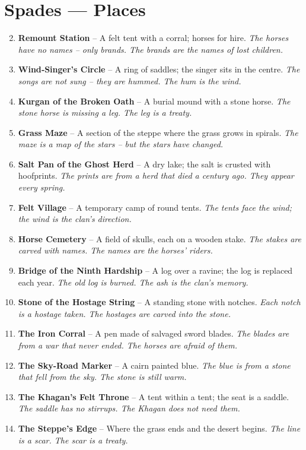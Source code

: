 \documentclass[11pt]{book}
\begin{document}
\section*{Spades — Places}
\begin{enumerate}
\setcounter{enumi}{1}
\item \textbf{Remount Station} – A felt tent with a corral; horses for hire. \textit{The horses have no names – only brands. The brands are the names of lost children.}
\item \textbf{Wind‑Singer’s Circle} – A ring of saddles; the singer sits in the centre. \textit{The songs are not sung – they are hummed. The hum is the wind.}
\item \textbf{Kurgan of the Broken Oath} – A burial mound with a stone horse. \textit{The stone horse is missing a leg. The leg is a treaty.}
\item \textbf{Grass Maze} – A section of the steppe where the grass grows in spirals. \textit{The maze is a map of the stars – but the stars have changed.}
\item \textbf{Salt Pan of the Ghost Herd} – A dry lake; the salt is crusted with hoofprints. \textit{The prints are from a herd that died a century ago. They appear every spring.}
\item \textbf{Felt Village} – A temporary camp of round tents. \textit{The tents face the wind; the wind is the clan’s direction.}
\item \textbf{Horse Cemetery} – A field of skulls, each on a wooden stake. \textit{The stakes are carved with names. The names are the horses’ riders.}
\item \textbf{Bridge of the Ninth Hardship} – A log over a ravine; the log is replaced each year. \textit{The old log is burned. The ash is the clan’s memory.}
\item \textbf{Stone of the Hostage String} – A standing stone with notches. \textit{Each notch is a hostage taken. The hostages are carved into the stone.}
\item[J] \textbf{The Iron Corral} – A pen made of salvaged sword blades. \textit{The blades are from a war that never ended. The horses are afraid of them.}
\item[Q] \textbf{The Sky‑Road Marker} – A cairn painted blue. \textit{The blue is from a stone that fell from the sky. The stone is still warm.}
\item[K] \textbf{The Khagan’s Felt Throne} – A tent within a tent; the seat is a saddle. \textit{The saddle has no stirrups. The Khagan does not need them.}
\item[A] \textbf{The Steppe’s Edge} – Where the grass ends and the desert begins. \textit{The line is a scar. The scar is a treaty.}
\end{enumerate}
\end{document}
